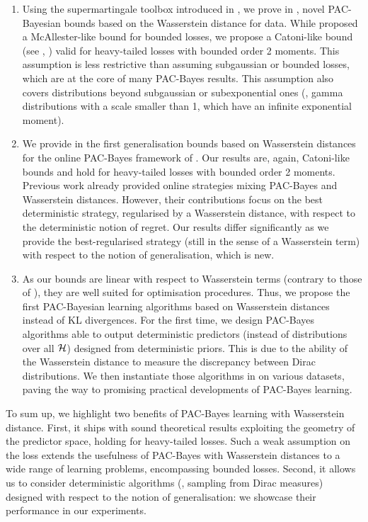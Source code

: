 \documentclass{article}
\begin{document}
\begin{enumerate}[label={\it (\roman*)}]
    \item Using the supermartingale toolbox introduced in \cite{haddouche2023pac,chugg2023unified}, we prove in , novel PAC-Bayesian bounds based on the Wasserstein distance for \iid data.
    While \cite{amit2022integral} proposed a McAllester-like bound for bounded losses, we propose a Catoni-like bound (see \eg, \citealp[Theorem 4.1]{alquier2016properties}) valid for heavy-tailed losses with bounded order 2 moments.
    This assumption is less restrictive than assuming subgaussian or bounded losses, which are at the core of many PAC-Bayes results.
    This assumption also covers distributions beyond subgaussian or subexponential ones (\eg, gamma distributions with a scale smaller than 1, which have an infinite exponential moment). 
    \item We provide in  the first generalisation bounds based on Wasserstein distances for the online PAC-Bayes framework of \cite{haddouche2022online}.
    Our results are, again, Catoni-like bounds and hold for heavy-tailed losses with bounded order 2 moments.
    Previous work \citep{chee2021learning} already provided online strategies mixing PAC-Bayes and Wasserstein distances.
    However, their contributions focus on the best deterministic strategy, regularised by a Wasserstein distance, with respect to the deterministic notion of regret.
    Our results differ significantly as we provide the best-regularised strategy (still in the sense of a Wasserstein term) with respect to the notion of generalisation, which is new.
    \item As our bounds are linear with respect to Wasserstein terms (contrary to those of \citealp{amit2022integral}), they are well suited for optimisation procedures.
    Thus, we propose the first PAC-Bayesian learning algorithms based on Wasserstein distances instead of KL divergences.
    For the first time, we design PAC-Bayes algorithms able to output deterministic predictors (instead of distributions over all $\mathcal{H}$) designed from deterministic priors.
    This is due to the ability of the Wasserstein distance to measure the discrepancy between Dirac distributions.     
    We then instantiate those algorithms in  on various datasets, paving the way to promising practical developments of PAC-Bayes learning. 
\end{enumerate}

To sum up, we highlight two benefits of PAC-Bayes learning with Wasserstein distance.
First, it ships with sound theoretical results exploiting the geometry of the predictor space, holding for heavy-tailed losses.
Such a weak assumption on the loss extends the usefulness of PAC-Bayes with Wasserstein distances to a wide range of learning problems, encompassing bounded losses.
Second, it allows us to consider deterministic algorithms (\ie, sampling from Dirac measures) designed with respect to the notion of generalisation: we showcase their performance in our experiments.
\end{document}
